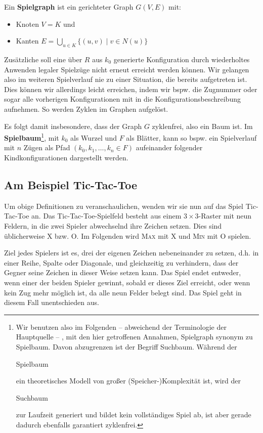 \documentclass[a4paper]{scrartcl}
\newcommand\e[1]{\begin{em}#1\end{em}}
\newcommand\q[1]{\glqq #1\grqq}
\begin{document}
Ein \textbf{Spielgraph} ist ein gerichteter Graph $G(V,E)$ mit: 
\begin{itemize}
	\item Knoten $V = K$ und
	\item Kanten $E = \bigcup\limits_{u \in K}\{(u,v) \mid v \in N(u)\}$
\end{itemize}

Zusätzliche soll eine über $R$ aus $k_0$ generierte Konfiguration durch wiederholtes Anwenden legaler Spielzüge nicht erneut erreicht werden können. Wir gelangen also im weiteren Spielverlauf nie zu einer Situation, die bereits aufgetreten ist. Dies können wir allerdings leicht erreichen, indem wir bspw. die Zugnummer oder sogar alle vorherigen Konfigurationen mit in die Konfigurationsbeschreibung aufnehmen. So werden Zyklen im Graphen aufgelöst.

Es folgt damit insbesondere, dass der Graph $G$ zyklenfrei, also ein Baum ist. Im \textbf{Spielbaum}\footnote{\label{suchbaum}Wir benutzen also im Folgenden -- abweichend der Terminologie der Hauptquelle\cite{klueppel:2016} -- , mit den hier getroffenen Annahmen, \q{Spielgraph} synonym zu \q{Spielbaum}. Davon abzugrenzen ist der Begriff \q{Suchbaum}. Während der \e{Spielbaum} ein theoretisches Modell von großer (Speicher-)Komplexität ist, wird der \e{Suchbaum} zur Laufzeit generiert und bildet kein vollständiges Spiel ab, ist aber gerade dadurch ebenfalls garantiert zyklenfrei.}, mit $k_0$ als Wurzel und $F$ als Blätter, kann so bspw. ein Spielverlauf mit $n$ Zügen als Pfad $(k_0, k_1, \dots, k_n \in F)$ aufeinander folgender Kindkonfigurationen dargestellt werden.


\subsection{Am Beispiel Tic-Tac-Toe}

Um obige Definitionen zu veranschaulichen, wenden wir sie nun auf das Spiel Tic-Tac-Toe an. Das Tic-Tac-Toe-Spielfeld besteht aus einem $3 \times 3$-Raster mit neun Feldern, in die zwei Spieler abwechselnd ihre Zeichen setzen. Dies sind üblicherweise \q{X} bzw. \q{O}. Im Folgenden wird \textsc{Max} mit \q{X} und \textsc{Min} mit \q{O} spielen.

Ziel jedes Spielers ist es, drei der eigenen Zeichen nebeneinander zu setzen, d.h. in einer Reihe, Spalte oder Diagonale, und gleichzeitig zu verhindern, dass der Gegner seine Zeichen in dieser Weise setzen kann. Das Spiel endet entweder, wenn einer der beiden Spieler gewinnt, sobald er dieses Ziel erreicht, oder wenn kein Zug mehr möglich ist, da alle neun Felder belegt sind. Das Spiel geht in diesem Fall unentschieden aus.
\end{document}
